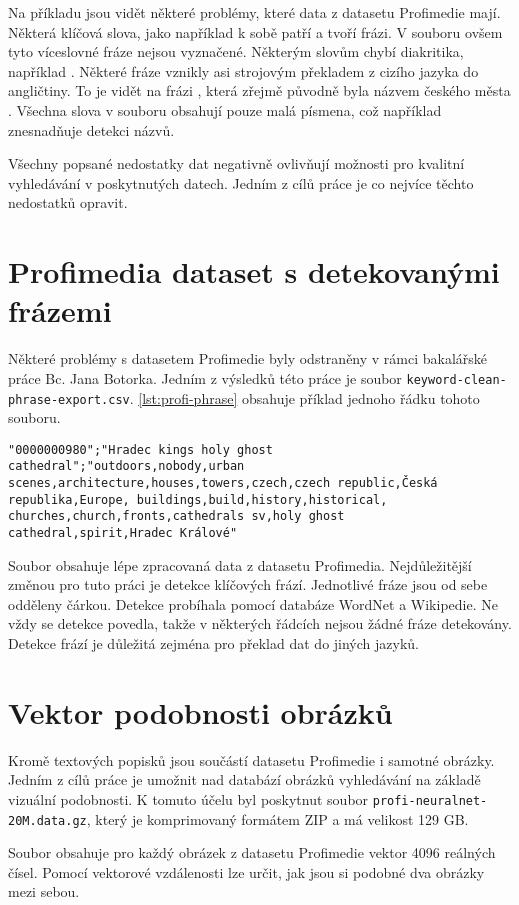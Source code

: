 Na příkladu jsou vidět některé problémy, které data z datasetu Profimedie mají. Některá klíčová slova, jako například  k sobě patří a tvoří frázi. V souboru ovšem tyto víceslovné fráze nejsou vyznačené. Některým slovům chybí diakritika, například . Některé fráze vznikly asi strojovým překladem z cizího jazyka do angličtiny. To je vidět na frázi , která zřejmě původně byla názvem českého města . Všechna slova v souboru obsahují pouze malá písmena, což například znesnadňuje detekci názvů.

Všechny popsané nedostatky dat negativně ovlivňují možnosti pro kvalitní vyhledávání v poskytnutých datech. Jedním z cílů práce je co nejvíce těchto nedostatků opravit.

\section{Profimedia dataset s detekovanými frázemi}

Některé problémy s datasetem Profimedie byly odstraněny v rámci bakalářské práce Bc. Jana Botorka\cite{botorek}. Jedním z výsledků této práce je soubor \lstinline{keyword-clean-phrase-export.csv}. \autoref{lst:profi-phrase} obsahuje příklad jednoho řádku tohoto souboru.

\begin{lstlisting}[caption={Řádek souboru keyword-clean-phrase-export.csv},label={lst:profi-phrase}]
"0000000980";"Hradec kings holy ghost cathedral";"outdoors,nobody,urban scenes,architecture,houses,towers,czech,czech republic,Česká republika,Europe, buildings,build,history,historical, churches,church,fronts,cathedrals sv,holy ghost cathedral,spirit,Hradec Králové"
\end{lstlisting}

Soubor obsahuje lépe zpracovaná data z datasetu Profimedia. Nejdůležitější změnou pro tuto práci je detekce klíčových frází. Jednotlivé fráze jsou od sebe odděleny čárkou. Detekce probíhala pomocí databáze WordNet\cite{wordnet} a Wikipedie. Ne vždy se detekce povedla, takže v některých řádcích nejsou žádné fráze detekovány. Detekce frází je důležitá zejména pro překlad dat do jiných jazyků.

\section{Vektor podobnosti obrázků}

Kromě textových popisků jsou součástí datasetu Profimedie i samotné obrázky. Jedním z cílů práce je umožnit nad databází obrázků vyhledávání na základě vizuální podobnosti. K tomuto účelu byl poskytnut soubor \lstinline{profi-neuralnet-20M.data.gz}, který je komprimovaný formátem ZIP a má velikost 129 GB.

Soubor obsahuje pro každý obrázek z datasetu Profimedie vektor 4096 reálných čísel. Pomocí vektorové vzdálenosti lze určit, jak jsou si podobné dva obrázky mezi sebou.


